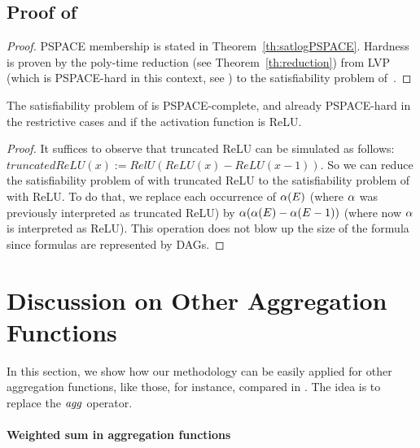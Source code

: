 \subsection{Proof of }


\begin{proof}
      PSPACE membership is stated in Theorem~\ref{th:satlogPSPACE}. Hardness is proven by the poly-time reduction (see Theorem~\ref{th:reduction}) from LVP (which is PSPACE-hard in this context, see ) to the satisfiability problem of~\thelogic{}. 
\end{proof}

\begin{corollary}
The satisfiability problem of \thelogic{} is PSPACE-complete, and already PSPACE-hard in the restrictive cases and if the activation function is ReLU.
\end{corollary}

\begin{proof}
    It suffices to observe that truncated ReLU can be simulated as follows:
    $truncatedReLU(x) := RelU(ReLU(x) - ReLU(x-1))$.
%
    So we can reduce the satisfiability problem of \thelogic{} with truncated ReLU to the satisfiability problem of \thelogic{} with ReLU. To do that, we replace each occurrence of $\alpha(E)$ (where $\alpha$ was previously interpreted as truncated ReLU) by $\alpha(\alpha(E) - \alpha(E-1))$ (where now $\alpha$ is interpreted as ReLU). This operation does not blow up the size of the formula since formulas are represented by DAGs. 
\end{proof}
















\section{Discussion on Other Aggregation Functions}
\label{appendix-section-aggregation}

In this section, we show how our methodology can be easily applied for other aggregation functions, like those, for instance, compared in \citet{RosenbluthTG23}. The idea is to replace the $\mathit{agg}$ operator.
\paragraph{Weighted sum in aggregation functions}

